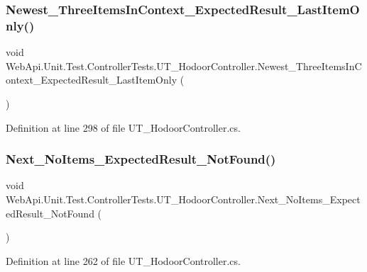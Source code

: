 \subsubsection{\texorpdfstring{Newest\+\_\+\+Three\+Items\+In\+Context\+\_\+\+Expected\+Result\+\_\+\+Last\+Item\+Only()}{Newest\_ThreeItemsInContext\_ExpectedResult\_LastItemOnly()}}
{\footnotesize\ttfamily void Web\+Api.\+Unit.\+Test.\+Controller\+Tests.\+U\+T\+\_\+\+Hodoor\+Controller.\+Newest\+\_\+\+Three\+Items\+In\+Context\+\_\+\+Expected\+Result\+\_\+\+Last\+Item\+Only (\begin{DoxyParamCaption}{ }\end{DoxyParamCaption})}



Definition at line 298 of file U\+T\+\_\+\+Hodoor\+Controller.\+cs.

\mbox{\label{class_web_api_1_1_unit_1_1_test_1_1_controller_tests_1_1_u_t___hodoor_controller_a679ad78c6bacab071bdda4bca41a7299}} 
\subsubsection{\texorpdfstring{Next\+\_\+\+No\+Items\+\_\+\+Expected\+Result\+\_\+\+Not\+Found()}{Next\_NoItems\_ExpectedResult\_NotFound()}}
{\footnotesize\ttfamily void Web\+Api.\+Unit.\+Test.\+Controller\+Tests.\+U\+T\+\_\+\+Hodoor\+Controller.\+Next\+\_\+\+No\+Items\+\_\+\+Expected\+Result\+\_\+\+Not\+Found (\begin{DoxyParamCaption}{ }\end{DoxyParamCaption})}



Definition at line 262 of file U\+T\+\_\+\+Hodoor\+Controller.\+cs.

